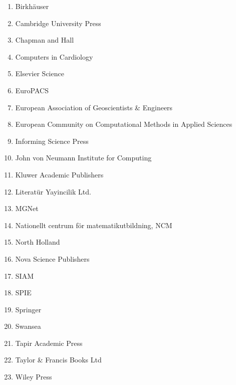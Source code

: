 \begin{enumerate}
\item
 Birkh{\"a}user\\
\item
 Cambridge University Press\\
\item
 Chapman and Hall\\
\item
 Computers in Cardiology\\
\item
 Elsevier Science\\
\item
 EuroPACS\\
\item
 European Association of Geoscientists \& Engineers\\
\item
 European Community on Computational Methods in Applied Sciences\\
\item
 Informing Science Press\\
\item
 John von Neumann Institute for Computing\\
\item
 Kluwer Academic Publishers\\
\item
 Literat{\"u}r Yayincilik Ltd.\\
\item
 MGNet\\
\item
 Nationellt centrum f{\"o}r matematikutbildning, NCM\\
\item
 North Holland\\
\item
 Nova Science Publishers\\
\item
 SIAM\\
\item
 SPIE\\
\item
 Springer\\
\item
 Swansea\\
\item
 Tapir Academic Press\\
\item
 Taylor \& Francis Books Ltd\\
\item
 Wiley Press\\
\end{enumerate}
